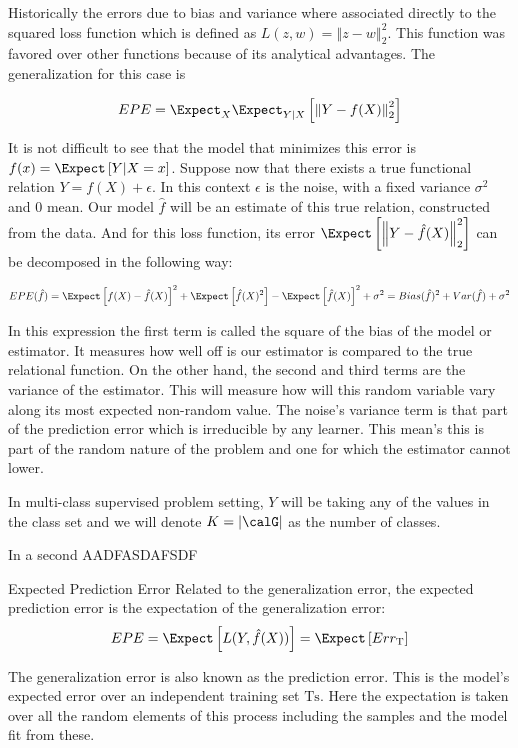 Historically the errors due to bias and variance where associated directly to the squared loss function which is defined as $L(z,w) = \left\Vert z-w \right\Vert^2_2$. This function was favored over other functions because of its analytical advantages.  The generalization for this case is

\begin{equation}\label{squaredEPE}
EPE = \Expect_X \Expect_{Y|X} \left[ \left\Vert  Y - f(X)  \right\Vert_2^2 \right]
\end{equation}

It is not difficult to see that the model that minimizes this error is $f(x) = \Expect \left[ Y | X=x \right] $. Suppose now that there exists a true functional relation $Y = f(X) + \epsilon$. 
In this context $\epsilon$ is the noise, with a fixed variance $\sigma^2$ and $0$ mean. Our model $\hat{f}$ will be an estimate of this true relation, constructed from the data. And for this loss function, its error $\Expect \left[ \left\Vert Y  - \hat{f}(X) \right\Vert_2^2 \right]$ can be decomposed in the following way:

\begin{equation}\label{squaredBiasDecomposition}
EPE( \hat{f} ) = \Expect \left[   f(X)  - \hat{f}(X) \right]^2 +  \Expect \left[ \hat{f}(X)^2  \right] - \Expect \left[ \hat{f}(X)  \right]^2  + \sigma^2
= Bias(\hat{f})^2 + Var(\hat{f}) + \sigma^2
\end{equation}

In this expression the first term is called the square of the bias of the model or estimator. It measures how well off is our estimator is compared to the true relational function. On the other hand, the second and third terms are the variance of the estimator. This will measure how will this random variable vary along its most expected non-random value. The noise's variance term is that part of the prediction error which is irreducible by any learner. This mean's this is part of the random nature of the problem and one for which the estimator cannot lower.



In multi-class supervised problem setting, $Y$ will be taking any of the values in the class set \calG and we will denote $K = |\calG|$ as the number of classes.




In a second AADFASDAFSDF

\begin{definition}{Expected Prediction Error}
	Related to the generalization error, the expected prediction error is the expectation of the generalization error:
	$$ EPE = \Expect \left[ L(Y,\hat{f}(X))\right] =  \Expect \left[ Err_{\mathrm{T}}  \right]$$
\end{definition}
The generalization error is also known as the prediction error. This is the model's expected error over an independent training set $\mathrm{Ts}$. Here the expectation is taken over all the random elements of this process including the samples and the model fit from these. 

